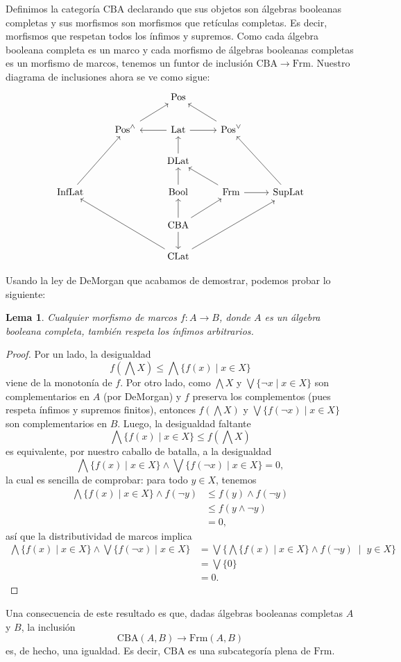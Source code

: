 \documentclass[12pt,letterpaper,titlepage]{article}
\newtheorem{lemma}{Lema}
\theoremstyle{definition}
\newcommand\Sup{\bigvee}
\renewcommand\inf{\wedge}
\newcommand\Inf{\bigwedge}
\newcommand\<{\langle}
\renewcommand\>{\rangle}
\newcommand{\Frm}{\mathrm{Frm}}
\newcommand{\Pos}{\mathrm{Pos}}
\newcommand{\Lat}{\mathrm{Lat}}
\newcommand{\SupLat}{\mathrm{SupLat}}
\newcommand{\InfLat}{\mathrm{InfLat}}
\newcommand{\CLat}{\mathrm{CLat}}
\newcommand{\DLat}{\mathrm{DLat}}
\newcommand{\CBA}{\mathrm{CBA}}
\newcommand{\Bool}{\mathrm{Bool}}
\begin{document}
Definimos la categoría $\CBA$ declarando que sus objetos son
álgebras booleanas completas y sus morfismos son morfismos que
retículas completas.
Es decir, morfismos que respetan todos los ínfimos y supremos.
Como cada álgebra booleana completa es un marco y cada
morfismo de álgebras booleanas completas es un morfismo de marcos,
tenemos un funtor de inclusión $\CBA\to\Frm$.
Nuestro diagrama de inclusiones ahora se ve como sigue:
\[
    \begin{tikzcd}
        &  & \Pos & & \\
        & \Pos^\wedge \arrow[ru]
        & \Lat \arrow[l] \arrow[r]
        & \Pos^\vee  \arrow[lu] & \\
        & & \DLat \arrow[u] & & \\
        \InfLat \arrow[ruu]
        & & \Bool \arrow[u]
        & \Frm \arrow[r] \arrow[lu]
        & \SupLat \arrow[luu] \\
        & & \CBA \arrow[d] \arrow[u] \arrow[ur] 
        & & \\
        & & \CLat \arrow[rruu]
        \arrow[lluu] & &
    \end{tikzcd}
\]

Usando la ley de DeMorgan que acabamos de demostrar,
podemos probar lo siguiente:
\begin{lemma}
    Cualquier morfismo de marcos $f:A\to B$,
    donde $A$ es un álgebra booleana completa,
    también respeta los ínfimos arbitrarios.
\end{lemma}
\begin{proof}
    Por un lado, la desigualdad
    \[
        f(\Inf X)\leq\Inf\{f(x)\mid x\in X\}
    \]
    viene de la monotonía de $f$.
    Por otro lado, como $\Inf X$ y $\Sup\{\neg x\mid x\in X\}$
    son complementarios en $A$ (por DeMorgan)
    y $f$ preserva los complementos
    (pues respeta ínfimos y supremos finitos), entonces $f(\Inf X)$
    y $\Sup\{f(\neg x)\mid x\in X\}$ son complementarios en $B$.
    Luego, la desigualdad faltante
    \[
        \Inf\{f(x)\mid x\in X\} \leq f(\Inf X)
    \]
    es equivalente, por nuestro caballo de batalla, a la desigualdad
    \[
        \Inf\{f(x)\mid x\in X\} \inf \Sup\{f(\neg x)\mid x\in X\} = 0,
    \]
    la cual es sencilla de comprobar: para todo $y\in X$, tenemos
    \begin{align*}
        \Inf\{f(x)\mid x\in X\} \inf f(\neg y)
        &\leq f(y)\inf f(\neg y) \\
        &\leq f(y\inf \neg y) \\
        &= 0,
    \end{align*}
    así que la distributividad de marcos implica
    \begin{align*}
        \Inf\{f(x)\mid x\in X\} \inf \Sup\{f(\neg x)\mid x\in X\}
        &= \Sup\Big\{\Inf\{f(x)\mid x\in X\}\inf f(\neg y)
            \;\;\Big|\;\; y\in X\Big\} \\
        &= \Sup\{0\} \\
        &= 0.
    \end{align*}
\end{proof}
Una consecuencia de este resultado es que,
dadas álgebras booleanas completas $A$ y $B$, la inclusión
\[
    \CBA(A,B) \to \Frm(A,B)
\]
es, de hecho, una igualdad.
Es decir, $\CBA$ es una subcategoría plena de $\Frm$.
\end{document}
